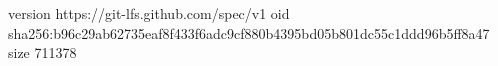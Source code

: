 version https://git-lfs.github.com/spec/v1
oid sha256:b96c29ab62735eaf8f433f6adc9cf880b4395bd05b801dc55c1ddd96b5ff8a47
size 711378
